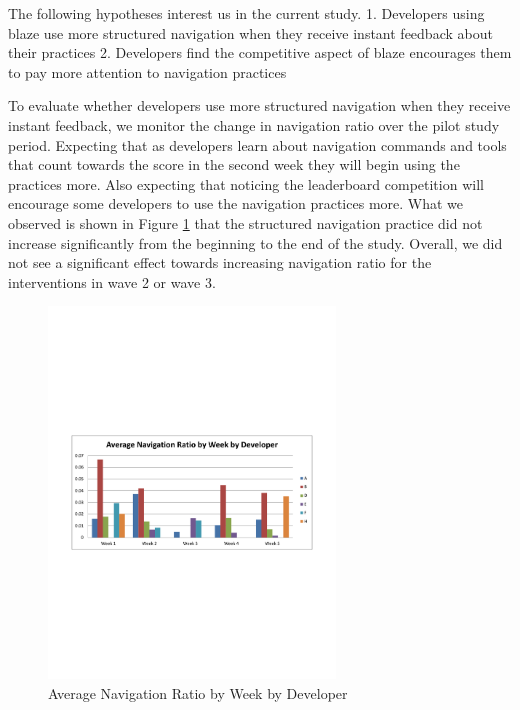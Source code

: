 \documentclass{sig-alternate}
\begin{document}
The following hypotheses interest us in the current study.  
1. Developers using blaze use more structured navigation when they receive instant feedback about their practices
2. Developers find the competitive aspect of blaze encourages them to pay more attention to navigation practices

To evaluate whether developers use more structured navigation when they receive instant feedback, we monitor the change in navigation ratio over the pilot study period.   Expecting that as developers learn about navigation commands and tools that count towards the score in the second week they will begin using the practices more.  Also expecting that noticing the leaderboard competition will encourage some developers to use the navigation practices more.  What we observed is shown in Figure \ref{fig:navigationaverage} that the structured navigation practice did not increase significantly from the beginning to the end of the study.  Overall, we did not see a significant effect towards increasing navigation ratio for the interventions in wave 2 or wave 3.   

\begin{figure}\begin{mdframed}[linecolor=white]
	\includegraphics[width=3in]{navigationaverage.pdf}
	\caption{Average Navigation Ratio by Week by Developer}
	\label{fig:navigationaverage}
\end{mdframed}\end{figure}
\end{document}

